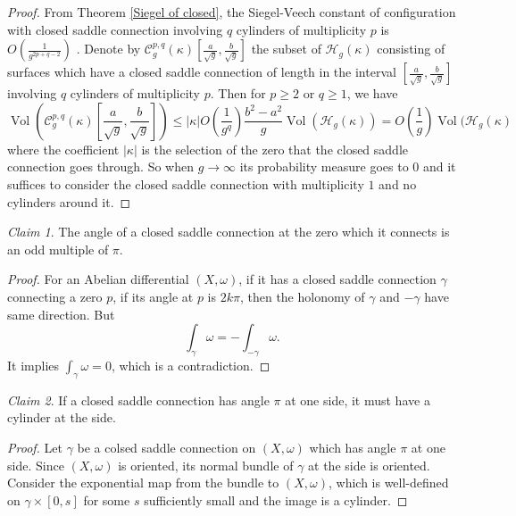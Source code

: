 \documentclass[12pt]{amsart} %
\theoremstyle{definition}
\theoremstyle{remark}
\numberwithin{equation}{section}
\newtheorem{clm}{Claim}
\renewcommand\H{{\mathcal H}}
\newcommand{\V}{\operatorname{Vol}}
\begin{document}
\begin{proof}
From Theorem \ref{Siegel of closed}, 
the Siegel-Veech constant of configuration with closed saddle connection involving $q$ cylinders of multiplicity $p$ is $O(\frac{1}{g^{2p+q-2}})$ . 
Denote by $\mathcal{C}^{p,q}_g(\kappa)[\frac{a}{\sqrt{g}},\frac{b}{\sqrt{g}}]$ the subset of $\H_g(\kappa)$ consisting of surfaces which have a closed saddle connection 
of length in the interval $[\frac{a}{\sqrt{g}},\frac{b}{\sqrt{g}}]$
involving $q$ cylinders of multiplicity $p$.
Then for $p\geq 2$ or $q\geq 1$, we have
 $$\V(\mathcal{C}^{p,q}_g(\kappa)[\frac{a}{\sqrt{g}},\frac{b}{\sqrt{g}}])\leq |\kappa|O(\frac{1}{g^{q}})\frac{b^2-a^2}{g}\V(\H_g(\kappa))=O(\frac{1}{g})\V(\H_g(\kappa)$$
where the coefficient $|\kappa|$ is the selection of the zero that the closed saddle connection goes through. 
So when $g\to \infty$ its probability measure goes to $0$ 
and it suffices to consider the closed saddle connection with multiplicity $1$ and no cylinders around it.
\end{proof}

\begin{clm} \label{clm3}
The angle of a closed saddle connection at the zero which it connects is an odd multiple of $\pi$.
\end{clm}

\begin{proof}
For an Abelian differential $(X,\omega)$, if it has a closed saddle connection $\gamma$ connecting a zero $p$, if its angle at $p$ is $2k\pi$,
then the holonomy of $\gamma$ and $-\gamma$ have same direction. But
$$\int_\gamma \omega=-\int_{-\gamma} \omega.$$
It implies $\int_\gamma \omega=0$, which is a contradiction.
\end{proof}

\begin{clm} \label{clm4}
If a closed saddle connection has angle $\pi$ at one side, it must have a cylinder at the side.
\end{clm}

\begin{proof}
Let $\gamma$ be a colsed saddle connection on $(X,\omega)$ which has angle $\pi$ at one side. Since $(X,\omega)$ is oriented, its normal bundle of $\gamma$ at the side is oriented.
Consider the exponential map from the bundle to $(X,\omega)$, which is well-defined on $\gamma \times [0,s]$ for some $s$ sufficiently small and the image is a cylinder.

\end{proof}
\end{document}
